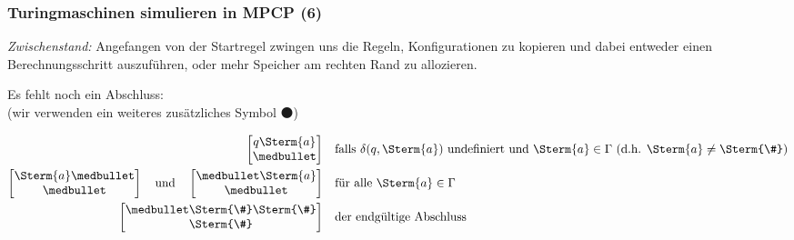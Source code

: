 \documentclass[aspectratio=1610,onlymath]{beamer}
\begin{document}
\begin{frame}\frametitle{Turingmaschinen simulieren in MPCP (6)}

\emph{Zwischenstand:} Angefangen von der Startregel zwingen uns die Regeln, Konfigurationen
zu kopieren und dabei entweder einen Berechnungsschritt auszuführen, oder mehr Speicher am
rechten Rand zu allozieren.
\bigskip\pause

Es fehlt noch ein \alert{Abschluss:}\\
{(wir verwenden ein weiteres zusätzliches Symbol $\medbullet$)}

\begin{align*}
\left[\begin{matrix}q\Sterm{a}\\\medbullet\end{matrix}\right]\quad
	& \text{falls $\delta(q,\Sterm{a})$ undefiniert und $\Sterm{a}\in\Gamma$ (d.h. $\Sterm{a}\neq\Sterm{\#}$)}\\
\left[\begin{matrix}\Sterm{a}\medbullet\\\medbullet\end{matrix}\right]\quad\text{und}\quad\left[\begin{matrix}\medbullet\Sterm{a}\\\medbullet\end{matrix}\right]\quad
	& \text{für alle $\Sterm{a}\in\Gamma$}\\
\left[\begin{matrix}\medbullet\Sterm{\#}\Sterm{\#}\\\Sterm{\#}\end{matrix}\right]\quad
	& \text{der endgültige Abschluss}
\end{align*}

\end{frame}
\end{document}
